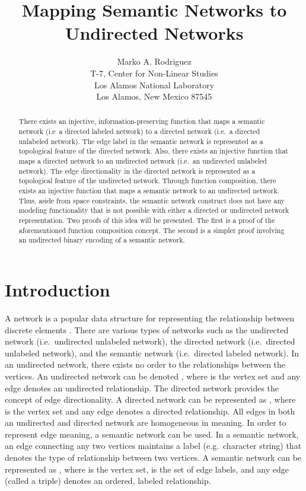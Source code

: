 \documentclass[twocolumn,preprintnumbers,amsmath,amssymb,letter]{revtex4}
\begin{document}

\title{Mapping Semantic Networks to Undirected Networks}

\author{Marko A. Rodriguez \\
		T-7, Center for Non-Linear Studies \\
		Los Alamos National Laboratory \\
		Los Alamos, New Mexico 87545}
		

 \begin{abstract}
There exists an injective, information-preserving function that maps a semantic network (i.e~a directed labeled network) to a directed network (i.e.~a directed unlabeled network). The edge label in the semantic network is represented as a topological feature of the directed network. Also, there exists an injective function that maps a directed network to an undirected network (i.e.~an undirected unlabeled network). The edge directionality in the directed network is represented as a topological feature of the undirected network. Through function composition, there exists an injective function that maps a semantic network to an undirected network. Thus, aside from space constraints, the semantic network construct does not have any modeling functionality that is not possible with either a directed or undirected network representation. Two proofs of this idea will be presented. The first is a proof of the aforementioned function composition concept. The second is a simpler proof involving an undirected binary encoding of a semantic network.
\end{abstract}

\maketitle{}

\section{Introduction}

A network is a popular data structure for representing the relationship between discrete elements \cite{netanal:brandes2005,netsci:newman2006}. There are various types of networks such as the undirected network (i.e.~undirected unlabeled network), the directed network (i.e.~directed unlabeled network), and the semantic network (i.e.~directed labeled network). In an undirected network, there exists no order to the relationships between the vertices. An undirected network can be denoted , where  is the vertex set and any edge  denotes an undirected relationship. The directed network provides the concept of edge directionality. A directed network can be represented as , where  is the vertex set and any edge  denotes a directed relationship. All edges in both an undirected and directed network are homogeneous in meaning. In order to represent edge meaning, a semantic network can be used. In a semantic network, an edge connecting any two vertices maintains a label (e.g.~character string) that denotes the type of relationship between two vertices. A semantic network can be represented as , where  is the vertex set,  is the set of edge labels, and any edge (called a triple)  denotes an ordered, labeled relationship.
\end{document}
